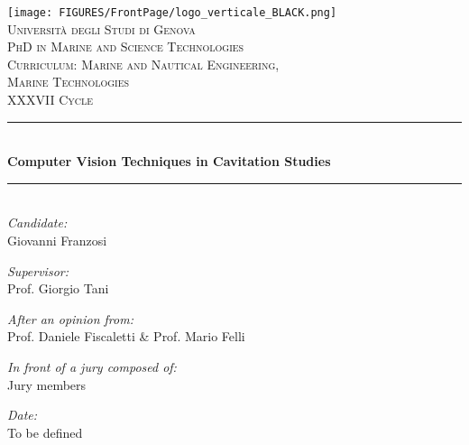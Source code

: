 \documentclass[10pt,b5paper,twoside]{book}
\begin{document}
\frontmatter
\begin{titlepage}
    \vspace{1cm}
    \begin{center}
        \texttt{[image: FIGURES/FrontPage/logo\_verticale\_BLACK.png]}\\[1cm]
        \textsc{\LARGE Università degli Studi di Genova}\\[1.5cm]
        
        \textsc{\Large PhD in Marine and Science Technologies} \\[0.5cm]
        \textsc{\large Curriculum: Marine and Nautical Engineering,} \\[0.25cm]
        \textsc{\large Marine Technologies} \\[0.5cm]
        \textsc{\Large XXXVII Cycle}
        \vspace{0.5cm}

        \rule{\linewidth}{0.5mm} \\[0.4cm]
        { \Large \bfseries Computer Vision Techniques in Cavitation Studies}\\[0.2cm]
        \rule{\linewidth}{0.5mm} \\[1cm]

        \large
        \emph{Candidate:}\\
        Giovanni Franzosi
        \vfill

        \large
        \emph{Supervisor:}\\
        Prof. Giorgio Tani
        \vfill

        \large
        \emph{After an opinion from:}\\
        Prof. Daniele Fiscaletti \& Prof. Mario Felli
        \vfill

        \large
        \emph{In front of a jury composed of:}\\
        Jury members
        \vfill

        \large
        \emph{Date:}\\
        To be defined
        \vfill
    \end{center}
\end{titlepage}



\tableofcontents 
\listoffigures    
\listoftables   

\mainmatter









\backmatter
\printbibliography
\end{document}
